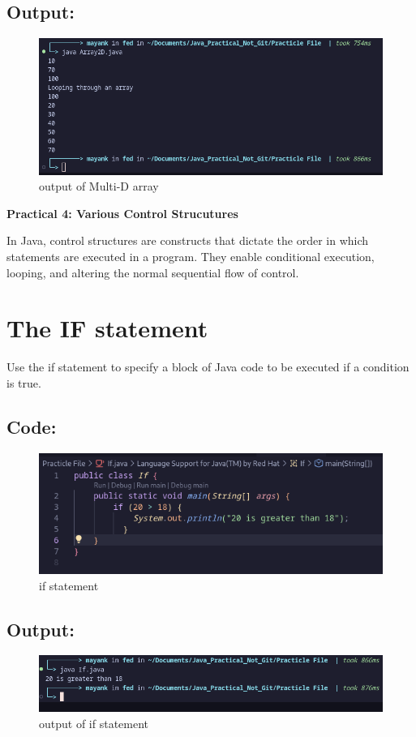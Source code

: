 \documentclass[a4paper,12pt]{article}
\newcommand{\practicaltitle}[1]{
    \newpage
    \begin{center}
        \Large\textbf{#1} \\
        \normalsize\vspace{0.5cm}
    \end{center}
}
\begin{document}
\subsection{Output: }
\begin{figure}[H]
    \centering
    \includegraphics[width=0.9\linewidth]{images/output3.png}
    \caption{output of Multi-D array}
    \label{fig:sample_image}
\end{figure}

\setcounter{section}{0}

\practicaltitle{Practical 4: Various Control Strucutures}
In Java, control structures are constructs that dictate the order in which statements are executed in a program. They enable conditional execution, looping, and altering the normal sequential flow of control.


\section{The IF statement}
Use the if statement to specify a block of Java code to be executed if a condition is true.
\subsection{Code: }
\begin{figure}[H]
    \centering
    \includegraphics[width=0.9\linewidth]{images/if.png}
    \caption{if statement}
    \label{fig:sample_image}
\end{figure}
\subsection{Output: }
\begin{figure}[H]
    \centering
    \includegraphics[width=0.9\linewidth]{images/output4.png}
    \caption{output of if statement}
    \label{fig:sample_image}
\end{figure}
\end{document}
